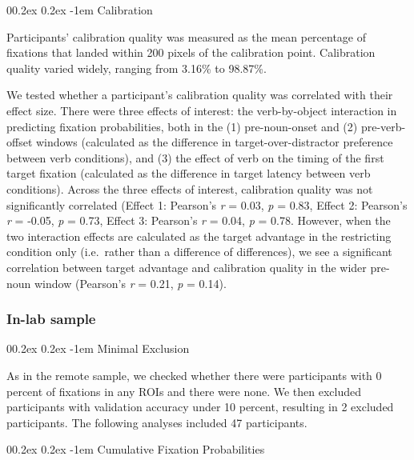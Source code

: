 \documentclass[
  man,floatsintext]{apa6}
\makeatletter
\let\oldparagraph\paragraph
\renewcommand{\paragraph}[1]{\oldparagraph{#1}\mbox{}}
\renewcommand{\paragraph}{\@startsection{paragraph}{4}{\parindent}%
  {0\baselineskip \@plus 0.2ex \@minus 0.2ex}%
  {-1em}%
  {\normalfont\normalsize\bfseries\itshape\typesectitle}}
\makeatother
\begin{document}
\hypertarget{calibration}{%
\paragraph{Calibration}\label{calibration}}

Participants' calibration quality was measured as the mean percentage of fixations that landed within 200 pixels of the calibration point. Calibration quality varied widely, ranging from 3.16\% to 98.87\%.

We tested whether a participant's calibration quality was correlated with their effect size. There were three effects of interest: the verb-by-object interaction in predicting fixation probabilities, both in the (1) pre-noun-onset and (2) pre-verb-offset windows (calculated as the difference in target-over-distractor preference between verb conditions), and (3) the effect of verb on the timing of the first target fixation (calculated as the difference in target latency between verb conditions). Across the three effects of interest, calibration quality was not significantly correlated (Effect 1: Pearson's \emph{r} = 0.03, \emph{p} = 0.83, Effect 2: Pearson's \emph{r} = -0.05, \emph{p} = 0.73, Effect 3: Pearson's \emph{r} = 0.04, \emph{p} = 0.78. However, when the two interaction effects are calculated as the target advantage in the restricting condition only (i.e.~rather than a difference of differences), we see a significant correlation between target advantage and calibration quality in the wider pre-noun window (Pearson's \emph{r} = 0.21, \emph{p} = 0.14).

\hypertarget{in-lab-sample-1}{%
\subsubsection{In-lab sample}\label{in-lab-sample-1}}

\hypertarget{minimal-exclusion-1}{%
\paragraph{Minimal Exclusion}\label{minimal-exclusion-1}}

As in the remote sample, we checked whether there were participants with 0 percent of fixations in any ROIs and there were none. We then excluded participants with validation accuracy under 10 percent, resulting in 2 excluded participants. The following analyses included 47 participants.

\hypertarget{cumulative-fixation-probabilities-1}{%
\paragraph{Cumulative Fixation Probabilities}\label{cumulative-fixation-probabilities-1}}
\end{document}
